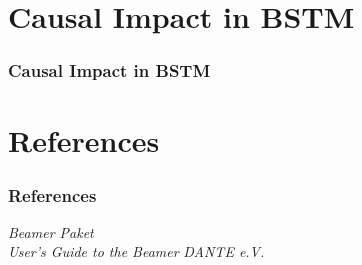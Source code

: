 \documentclass{beamer}
\begin{document}
\section{Causal Impact in BSTM}
\begin{frame}\frametitle{Causal Impact in BSTM}

\end{frame}

\section[Quellen]{References}
\begin{frame}\frametitle{References}

\begin{thebibliography}{9}
 \emph{Beamer Paket} \\ 
 \emph{User's Guide to the Beamer} 
 \emph{DANTE e.V.}    
\end{thebibliography}


\end{frame}
\end{document}
